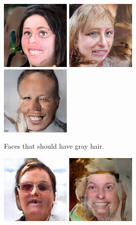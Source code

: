 \begin{figure}[!h]
\begin{subfigure}[b]{\textwidth}
{            \includegraphics[scale=0.485]{figures/ffhq/forced-hair-gray/ffhq128x128_hair_color_gray0003.png}
            \includegraphics[scale=0.485]{figures/ffhq/forced-hair-gray/ffhq128x128_hair_color_gray0004.png}
            \includegraphics[scale=0.485]{figures/ffhq/forced-hair-gray/ffhq128x128_hair_color_gray0005.png}
        }
        \caption{Faces that should have gray hair.}
        \vspace{0.1cm}
    \end{subfigure}
    \begin{subfigure}[b]{\textwidth}
        \centerline{
            \includegraphics[scale=0.485]{figures/ffhq/forced-hair-blonde/ffhq128x128_hair_color_blonde0000.png}
            \includegraphics[scale=0.485]{figures/ffhq/forced-hair-blonde/ffhq128x128_hair_color_blonde0001.png}
}
\end{subfigure}
\end{figure}
